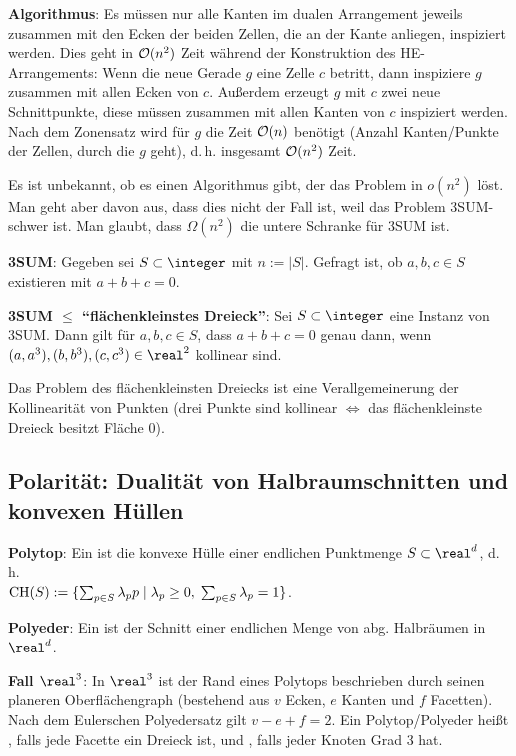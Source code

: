 \textbf{Algorithmus}:
Es müssen nur alle Kanten im dualen Arrangement jeweils
zusammen mit den Ecken der beiden Zellen, die an der Kante anliegen, inspiziert werden.
Dies geht in $\mathcal{O}(n^2)$ Zeit während der Konstruktion des HE-Arrangements:
Wenn die neue Gerade $g$ eine Zelle $c$ betritt, dann inspiziere $g$ zusammen mit allen Ecken von
$c$.
Außerdem erzeugt $g$ mit $c$ zwei neue Schnittpunkte, diese müssen zusammen mit allen Kanten
von $c$ inspiziert werden.
Nach dem Zonensatz wird für $g$ die Zeit $\mathcal{O}(n)$ benötigt
(Anzahl Kanten/Punkte der Zellen, durch die $g$ geht),
d.\,h. insgesamt $\mathcal{O}(n^2)$ Zeit.

\linie

Es ist unbekannt, ob es einen Algorithmus gibt, der das Problem in $o(n^2)$ löst.
Man geht aber davon aus, dass dies nicht der Fall ist, weil das Problem 3SUM-schwer ist.
Man glaubt, dass $\Omega(n^2)$ die untere Schranke für 3SUM ist.

\textbf{3SUM}:
Gegeben sei $S \subset \integer$ mit $n := |S|$.
Gefragt ist, ob $a, b, c \in S$ existieren mit $a + b + c = 0$.

\textbf{3SUM $\le$ "`flächenkleinstes Dreieck"'}:
Sei $S \subset \integer$ eine Instanz von 3SUM.
Dann gilt für $a, b, c \in S$, dass $a + b + c = 0$ genau dann, wenn
$(a, a^3), (b, b^3), (c, c^3) \in \real^2$ kollinear sind.

Das Problem des flächenkleinsten Dreiecks ist eine Verallgemeinerung der Kollinearität
von Punkten
(drei Punkte sind kollinear $\iff$ das flächenkleinste Dreieck besitzt Fläche $0$).

\pagebreak

\subsection{%
    Polarität: Dualität von Halbraumschnitten und konvexen Hüllen%
}

\textbf{Polytop}:
Ein  ist die konvexe Hülle einer
endlichen Punktmenge $S \subset \real^d$, d.\,h.\\
$\operatorname{CH}(S) := \{\sum_{p \in S} \lambda_p p \;|\; \lambda_p \ge 0,\; \sum_{p \in S} \lambda_p = 1\}$.

\textbf{Polyeder}:
Ein  ist der Schnitt einer endlichen Menge von abg. Halbräumen in $\real^d$.

\textbf{Fall $\real^3$}:
In $\real^3$ ist der Rand eines Polytops beschrieben durch seinen planeren Oberflächengraph
(bestehend aus $v$ Ecken, $e$ Kanten und $f$ Facetten).
Nach dem Eulerschen Polyedersatz gilt $v - e + f = 2$.
Ein Polytop/Polyeder heißt , falls jede Facette ein Dreieck ist,
und , falls jeder Knoten Grad 3 hat.

